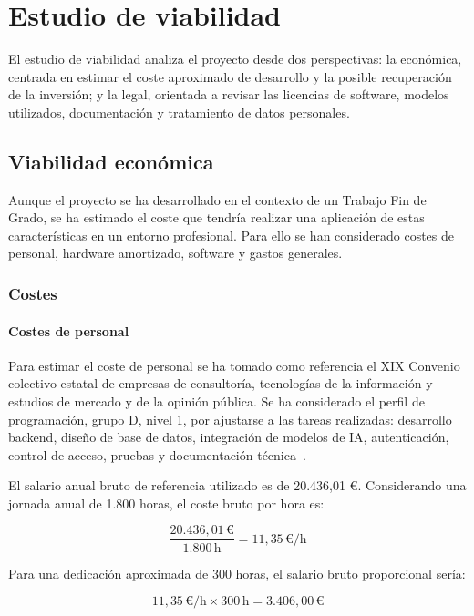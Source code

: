 \section{Estudio de viabilidad}

El estudio de viabilidad analiza el proyecto desde dos perspectivas: la económica, centrada en estimar el coste aproximado de desarrollo y la posible recuperación de la inversión; y la legal, orientada a revisar las licencias de software, modelos utilizados, documentación y tratamiento de datos personales.

\subsection{Viabilidad económica}

Aunque el proyecto se ha desarrollado en el contexto de un Trabajo Fin de Grado, se ha estimado el coste que tendría realizar una aplicación de estas características en un entorno profesional. Para ello se han considerado costes de personal, hardware amortizado, software y gastos generales.

\subsubsection{Costes}

\paragraph{Costes de personal}

Para estimar el coste de personal se ha tomado como referencia el XIX Convenio colectivo estatal de empresas de consultoría, tecnologías de la información y estudios de mercado y de la opinión pública. Se ha considerado el perfil de programación, grupo D, nivel 1, por ajustarse a las tareas realizadas: desarrollo backend, diseño de base de datos, integración de modelos de IA, autenticación, control de acceso, pruebas y documentación técnica~\cite{boe_convenio_tic_tablas_2026}.

El salario anual bruto de referencia utilizado es de 20.436,01 €. Considerando una jornada anual de 1.800 horas, el coste bruto por hora es:

\[
\frac{20.436,01\,\text{€}}{1.800\,\text{h}} = 11,35\,\text{€/h}
\]

Para una dedicación aproximada de 300 horas, el salario bruto proporcional sería:

\[
11,35\,\text{€/h} \times 300\,\text{h} = 3.406,00\,\text{€}
\]

